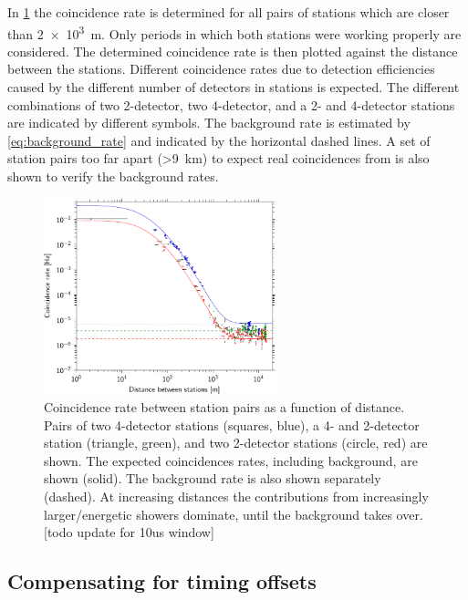 In \cref{fig:distance_v_coincidence_rate} the coincidence rate is determined for all pairs of stations which are closer than \SI{2e3}{\meter}. Only periods in which both stations were working properly are considered. The determined coincidence rate is then plotted against the distance between the stations. Different coincidence rates due to detection efficiencies caused by the different number of detectors in stations is expected. The different combinations of two 2-detector, two 4-detector, and a 2- and 4-detector stations are indicated by different symbols. The background rate is estimated by \cref{eq:background_rate} and indicated by the horizontal dashed lines. A set of station pairs too far apart (\SI{>9}{\kilo\meter}) to expect real coincidences from is also shown to verify the background rates.

\begin{figure}
    \centering
    \includegraphics[width=0.6\textwidth]
                    {plots/cluster/distance_v_coincidence_rate}
    \caption{Coincidence rate between station pairs as a function of distance. Pairs of two 4-detector stations (squares, blue), a 4- and 2-detector station (triangle, green), and two 2-detector stations (circle, red) are shown. The expected coincidences rates, including background, are shown (solid). The background rate is also shown separately (dashed). At increasing distances the contributions from increasingly larger/energetic showers dominate, until the background takes over. [todo update for 10us window]}
    \label{fig:distance_v_coincidence_rate}
\end{figure}


\subsection{Compensating for \gps timing offsets}

